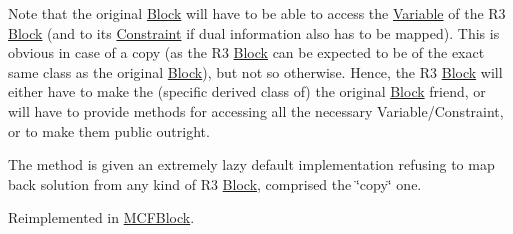 Note that the original \mbox{\hyperlink{class_s_m_spp__di__unipi__it_1_1_block}{Block}} will have to be able to access the \mbox{\hyperlink{class_s_m_spp__di__unipi__it_1_1_variable}{Variable}} of the R3 \mbox{\hyperlink{class_s_m_spp__di__unipi__it_1_1_block}{Block}} (and to its \mbox{\hyperlink{class_s_m_spp__di__unipi__it_1_1_constraint}{Constraint}} if dual information also has to be mapped). This is obvious in case of a copy (as the R3 \mbox{\hyperlink{class_s_m_spp__di__unipi__it_1_1_block}{Block}} can be expected to be of the exact same class as the original \mbox{\hyperlink{class_s_m_spp__di__unipi__it_1_1_block}{Block}}), but not so otherwise. Hence, the R3 \mbox{\hyperlink{class_s_m_spp__di__unipi__it_1_1_block}{Block}} will either have to make the (specific derived class of) the original \mbox{\hyperlink{class_s_m_spp__di__unipi__it_1_1_block}{Block}} friend, or will have to provide methods for accessing all the necessary Variable/\+Constraint, or to make them public outright.

The method is given an extremely lazy default implementation refusing to map back solution from any kind of R3 \mbox{\hyperlink{class_s_m_spp__di__unipi__it_1_1_block}{Block}}, comprised the \char`\"{}copy\char`\"{} one. 

Reimplemented in \mbox{\hyperlink{class_s_m_spp__di__unipi__it_1_1_m_c_f_block_aaab5f3727d85b0084832d6956470f21f}{M\+C\+F\+Block}}.

\mbox{\label{class_s_m_spp__di__unipi__it_1_1_block_a26eeed482e287e1f8a384826c789f9e0}} 
